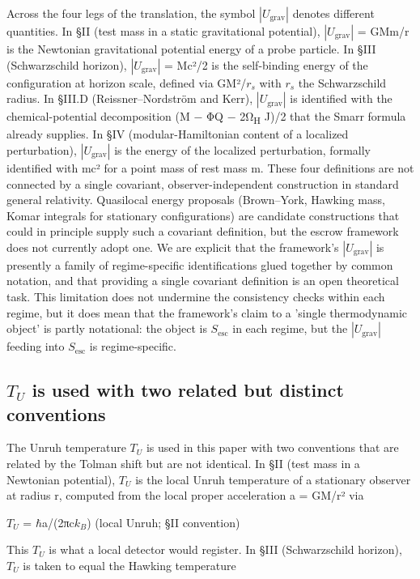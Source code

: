\documentclass[11pt]{article}
\begin{document}
Across the four legs of the translation, the symbol $|U_{\mathrm{grav}}|$ denotes
different quantities. In §II (test mass in a static gravitational
potential), $|U_{\mathrm{grav}}|$ = GMm/r is the Newtonian gravitational potential
energy of a probe particle. In §III (Schwarzschild horizon), $|U_{\mathrm{grav}}|$
= Mc²/2 is the self-binding energy of the configuration at horizon
scale, defined via GM²/$r_{s}$ with $r_{s}$ the Schwarzschild radius. In §III.D
(Reissner--Nordström and Kerr), $|U_{\mathrm{grav}}|$ is identified with the
chemical-potential decomposition (M − ΦQ − 2Ω\textsubscript{H} J)/2 that the Smarr
formula already supplies. In §IV (modular-Hamiltonian content of a
localized perturbation), $|U_{\mathrm{grav}}|$ is the energy of the localized
perturbation, formally identified with mc² for a point mass of rest mass
m. These four definitions are not connected by a single covariant,
observer-independent construction in standard general relativity.
Quasilocal energy proposals (Brown--York, Hawking mass, Komar integrals
for stationary configurations) are candidate constructions that could in
principle supply such a covariant definition, but the escrow framework
does not currently adopt one. We are explicit that the framework's
$|U_{\mathrm{grav}}|$ is presently a family of regime-specific identifications
glued together by common notation, and that providing a single covariant
definition is an open theoretical task. This limitation does not
undermine the consistency checks within each regime, but it does mean
that the framework's claim to a 'single thermodynamic object' is
partly notational: the object is $S_{\mathrm{esc}}$ in each regime, but the
$|U_{\mathrm{grav}}|$ feeding into $S_{\mathrm{esc}}$ is regime-specific.


\subsection{$T_{U}$ is used with two related but distinct conventions}

The Unruh temperature $T_{U}$ is used in this paper with two conventions
that are related by the Tolman shift but are not identical. In §II (test
mass in a Newtonian potential), $T_{U}$ is the local Unruh temperature of a
stationary observer at radius r, computed from the local proper
acceleration a = GM/r² via

$T_{U}$ = $\hbar$a/(2πc$k_{B}$) (local Unruh; §II convention)

This $T_{U}$ is what a local detector would register. In §III (Schwarzschild
horizon), $T_{U}$ is taken to equal the Hawking temperature
\end{document}

